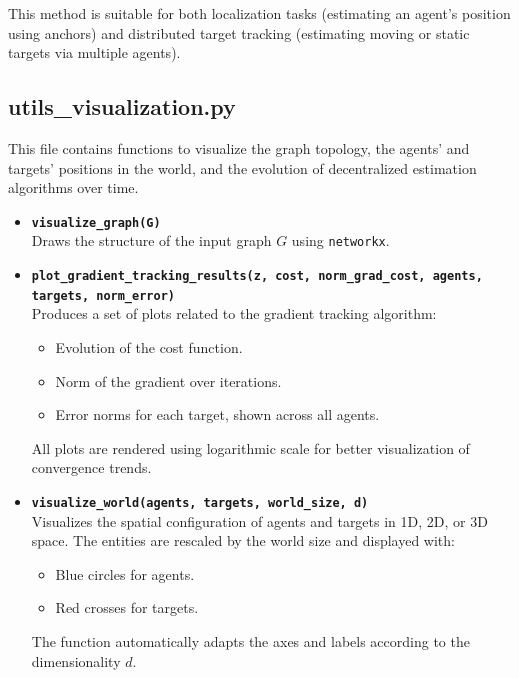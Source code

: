 \noindent This method is suitable for both localization tasks (estimating an agent's position using anchors) and distributed target tracking (estimating moving or static targets
via multiple agents).


\subsection*{\textbf{utils\_visualization.py}}

This file contains functions to visualize the graph topology, the agents' and targets' positions in the world, and the evolution of decentralized estimation algorithms over time.

\begin{itemize}
    \item \textbf{\texttt{visualize\_graph(G)}}\\
    Draws the structure of the input graph $G$ using \texttt{networkx}.

    \item \textbf{\texttt{plot\_gradient\_tracking\_results(z, cost, norm\_grad\_cost, agents, targets, norm\_error)}}\\
    Produces a set of plots related to the gradient tracking algorithm:
    \begin{itemize}
        \item Evolution of the cost function.
        \item Norm of the gradient over iterations.
        \item Error norms for each target, shown across all agents.
    \end{itemize}
    All plots are rendered using logarithmic scale for better visualization of convergence trends.

    \item \textbf{\texttt{visualize\_world(agents, targets, world\_size, d)}}\\
    Visualizes the spatial configuration of agents and targets in 1D, 2D, or 3D space. The entities are rescaled by the world size and displayed with:
    \begin{itemize}
        \item Blue circles for agents.
        \item Red crosses for targets.
    \end{itemize}
    The function automatically adapts the axes and labels according to the dimensionality $d$.


\end{itemize}
